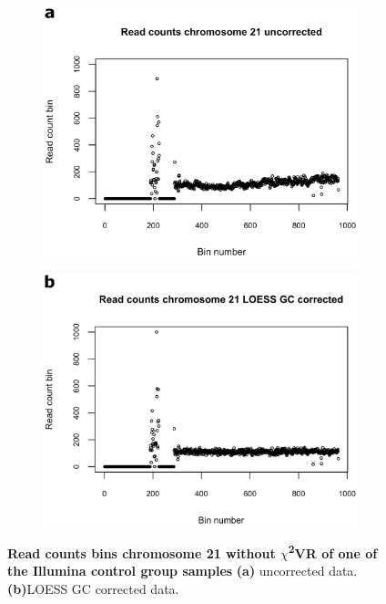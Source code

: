 \begin{figure}[h]
	\begin{subfigure}{.5\textwidth}
		\centering
		\includegraphics[width=1\linewidth]{img/NIPT_Supp1_Fig1_1a}
		\label{fig:NIPT_Supp1_Fig1_1a}
	\end{subfigure}%
	\begin{subfigure}{.5\textwidth}
		\centering
		\includegraphics[width=1\linewidth]{img/NIPT_Supp1_Fig1_1b}
		\label{fig:NIPT_Supp1_Fig1_1b}
	\end{subfigure} 
	\caption[Example effect $\chi$\textsuperscript{2}VR on bin counts]{\textbf{Read counts bins chromosome 21 without $\chi$\textsuperscript{2}VR of one of the Illumina control group samples} \textbf{(a)} uncorrected data. \textbf{(b)}LOESS GC corrected data.}
	\label{fig:NIPT_Supp1_Fig1_1}
\end{figure}

